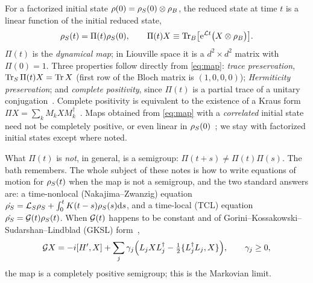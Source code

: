 For a factorized initial state $\rho(0)=\rho_{S}(0)\otimes\rho_{B}$, the reduced state at time $t$ is a linear function of the initial reduced state,
\begin{equation}
  \rho_{S}(t)=\Pi(t)\rho_{S}(0),\qquad \Pi(t)X\equiv\operatorname{Tr}_B\!\big[\mathrm{e}^{\mathcal{L} t}\big(X\otimes\rho_{B}\big)\big].
  \label{eq:map}
\end{equation}
$\Pi(t)$ is the \emph{dynamical map}; in Liouville space it is a $d^2\times d^2$ matrix with $\Pi(0)=1$.
Three properties follow directly from \cref{eq:map}: \emph{trace preservation}, $\operatorname{Tr}_S\Pi(t)X=\operatorname{Tr} X$ (first row of the Bloch matrix is $(1,0,0,0)$); \emph{Hermiticity preservation}; and \emph{complete positivity}, since $\Pi(t)$ is a partial trace of a unitary conjugation~\cite[Sec.~8.2.3]{Nielsen2010}.
Complete positivity is equivalent to the existence of a Kraus form $\Pi X=\sum_kM_kXM_k^\dagger$~\cite{Choi1975}.
Maps obtained from \cref{eq:map} with a \emph{correlated} initial state need not be completely positive, or even linear in $\rho_{S}(0)$~\cite{Pechukas1994}; we stay with factorized initial states except where noted.

What $\Pi(t)$ is \emph{not}, in general, is a semigroup: $\Pi(t+s)\ne\Pi(t)\Pi(s)$.
The bath remembers.
The whole subject of these notes is how to write equations of motion for $\rho_{S}(t)$ when the map is not a semigroup, and the two standard answers are: a time-nonlocal (Nakajima--Zwanzig) equation $\dot{\rho_{S}}=\mathcal{L}_S\rho_{S}+\int_0^tK(t-s)\rho_{S}(s)\mathrm{d} s$, and a time-local (TCL) equation $\dot{\rho_{S}}=\mathcal{G}(t)\rho_{S}(t)$.
When $\mathcal{G}(t)$ happens to be constant and of Gorini--Kossakowski--Sudarshan--Lindblad (GKSL) form~\cite{GKS1976,Lindblad1976},
\begin{equation}
  \mathcal{G} X=-i[H',X]+\sum_j\gamma_j\Big(L_jXL_j^\dagger-\tfrac12\{L_j^\dagger L_j,X\}\Big),\qquad\gamma_j\ge0,
  \label{eq:GKSL}
\end{equation}
the map is a completely positive semigroup; this is the Markovian limit.

